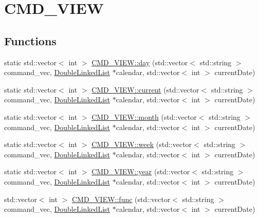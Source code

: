 \hypertarget{group__CMD__VIEW}{\section{C\-M\-D\-\_\-\-V\-I\-E\-W}
\label{group__CMD__VIEW}
}
\subsection*{Functions}
\begin{DoxyCompactItemize}
\item 
static std\-::vector$<$ int $>$ \hyperlink{group__CMD__VIEW_ga32d55ec99d38b5cd97d79445bbef0f55}{C\-M\-D\-\_\-\-V\-I\-E\-W\-::day} (std\-::vector$<$ std\-::string $>$ command\-\_\-vec, \hyperlink{classDoubleLinkedList}{Double\-Linked\-List} $\ast$calendar, std\-::vector$<$ int $>$ current\-Date)
\item 
static std\-::vector$<$ int $>$ \hyperlink{group__CMD__VIEW_ga765b53b18977b65084841a0c174e8e89}{C\-M\-D\-\_\-\-V\-I\-E\-W\-::current} (std\-::vector$<$ std\-::string $>$ command\-\_\-vec, \hyperlink{classDoubleLinkedList}{Double\-Linked\-List} $\ast$calendar, std\-::vector$<$ int $>$ current\-Date)
\item 
static std\-::vector$<$ int $>$ \hyperlink{group__CMD__VIEW_ga8439916f325db0849234ae3986f79200}{C\-M\-D\-\_\-\-V\-I\-E\-W\-::month} (std\-::vector$<$ std\-::string $>$ command\-\_\-vec, \hyperlink{classDoubleLinkedList}{Double\-Linked\-List} $\ast$calendar, std\-::vector$<$ int $>$ current\-Date)
\item 
static std\-::vector$<$ int $>$ \hyperlink{group__CMD__VIEW_ga91f5f2e0e36fb63759f10cbef6eb3366}{C\-M\-D\-\_\-\-V\-I\-E\-W\-::week} (std\-::vector$<$ std\-::string $>$ command\-\_\-vec, \hyperlink{classDoubleLinkedList}{Double\-Linked\-List} $\ast$calendar, std\-::vector$<$ int $>$ current\-Date)
\item 
static std\-::vector$<$ int $>$ \hyperlink{group__CMD__VIEW_ga2fb60e4917effba97d815318e91cced7}{C\-M\-D\-\_\-\-V\-I\-E\-W\-::year} (std\-::vector$<$ std\-::string $>$ command\-\_\-vec, \hyperlink{classDoubleLinkedList}{Double\-Linked\-List} $\ast$calendar, std\-::vector$<$ int $>$ current\-Date)
\item 
std\-::vector$<$ int $>$ \hyperlink{group__CMD__VIEW_gab9f53f36db853a3fac4e20a7f2747245}{C\-M\-D\-\_\-\-V\-I\-E\-W\-::func} (std\-::vector$<$ std\-::string $>$ command\-\_\-vec, \hyperlink{classDoubleLinkedList}{Double\-Linked\-List} $\ast$calendar, std\-::vector$<$ int $>$ current\-Date)
\end{DoxyCompactItemize}


